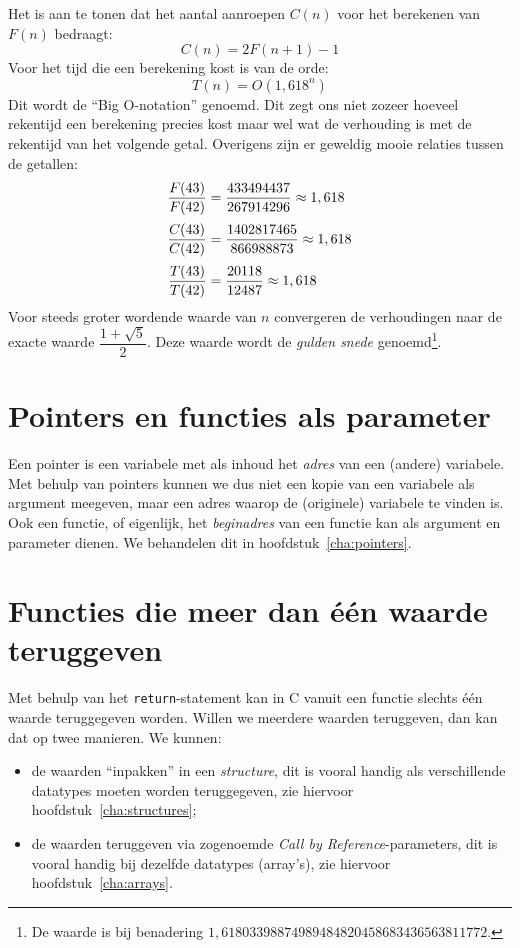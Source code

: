 Het is aan te tonen dat het aantal aanroepen $C(n)$ voor het berekenen van $F(n)$ bedraagt:
%
\begin{equation}
C(n) = 2F(n+1)-1
\end{equation}
%
Voor het tijd die een berekening kost is van de orde:
%
\begin{equation}
T(n) = O(1,618^n)
\end{equation}
%
Dit wordt de ``Big O-notation'' genoemd. Dit zegt ons niet zozeer hoeveel rekentijd een berekening precies kost maar wel wat de verhouding is met de rekentijd van het volgende getal. Overigens zijn er geweldig mooie relaties tussen de getallen:
%
\begin{equation}
\jot=5pt
\begin{split}
\dfrac{F(43)}{F(42)} &= \dfrac{433494437}{267914296}\approx 1,618\\
\dfrac{C(43)}{C(42)} &= \dfrac{1402817465}{866988873}\approx 1,618\\
\dfrac{T(43)}{T(42)} &= \dfrac{20118}{12487}\approx 1,618
\end{split}\end{equation}
%
Voor steeds groter wordende waarde van $n$ convergeren de verhoudingen naar de exacte waarde $\dfrac{1+\sqrt{5}}{2}$. Deze waarde wordt de \textsl{gulden snede} genoemd\footnote{De waarde is bij benadering $1,61803398874989484820458683436563811772$.}.
\basic


\section{Pointers en functies als parameter}
Een pointer is een variabele met als inhoud het \textsl{adres} van een (andere) variabele. Met behulp van pointers kunnen we dus niet een kopie van een variabele als argument meegeven, maar een adres waarop de (originele) variabele te vinden is. Ook een functie, of eigenlijk, het \textsl{beginadres} van een functie kan als argument en parameter dienen. We behandelen dit in hoofdstuk~\ref{cha:pointers}.


\section{Functies die meer dan één waarde teruggeven}
Met behulp van het \texttt{return}-statement kan in C vanuit een functie slechts één waarde teruggegeven worden.
Willen we meerdere waarden teruggeven, dan kan dat op twee manieren. 
We kunnen:
\begin{itemize}
	\item
	de waarden ``inpakken'' in een \textsl{structure}, dit is vooral handig als verschillende datatypes moeten worden teruggegeven, zie hiervoor hoofdstuk~\ref{cha:structures};
	\item
	de waarden teruggeven via zogenoemde \emph{Call by Reference}-parameters, dit is vooral handig bij dezelfde datatypes (array's), zie hiervoor hoofdstuk~\ref{cha:arrays}.
\end{itemize}


